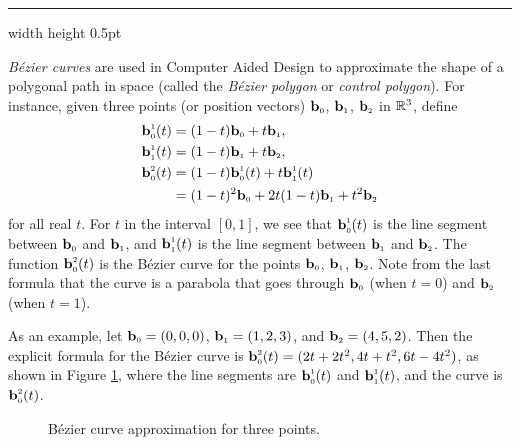 \smallskip
\hrule width \textwidth height 0.5pt
\begin{exmp}\label{exmp:bezier}
 \emph{B\'{e}zier curves} are used in Computer Aided Design to approximate the shape of a
 polygonal path in space (called the \emph{B\'{e}zier polygon} or \emph{control polygon}). For instance, given three
 points (or position vectors) $\textbf{b}_{\scriptscriptstyle 0}$, $\textbf{b}_{\scriptscriptstyle 1}$, $\textbf{b}_{\scriptscriptstyle 2}$ in $\mathbb{R}^{3}$,
 define
 \begin{align*}
  \textbf{b}_{\scriptscriptstyle 0}^{\scriptscriptstyle 1}(t) &= ( 1 - t )\textbf{b}_{\scriptscriptstyle 0} + t \textbf{b}_{\scriptscriptstyle 1},\\
  \textbf{b}_{\scriptscriptstyle 1}^{\scriptscriptstyle 1}(t) &= ( 1 - t )\textbf{b}_{\scriptscriptstyle 1} + t \textbf{b}_{\scriptscriptstyle 2},
  \\
  \textbf{b}_{\scriptscriptstyle 0}^{\scriptscriptstyle 2}(t) &=
  ( 1 - t )\textbf{b}_{\scriptscriptstyle 0}^{\scriptscriptstyle 1}(t) + t \textbf{b}_{\scriptscriptstyle 1}^{\scriptscriptstyle 1}(t)\\
  &= (1 - t)^2 \textbf{b}_{\scriptscriptstyle 0} + 2t(1 - t) \textbf{b}_{\scriptscriptstyle 1} + t^2 \textbf{b}_{\scriptscriptstyle 2}
 \end{align*}
 for all real $t$. For $t$ in the interval $[0,1]$, we see that $\textbf{b}_{\scriptscriptstyle 0}^{\scriptscriptstyle 1}(t)$ is the
 line segment between $\textbf{b}_{\scriptscriptstyle 0}$ and $\textbf{b}_{\scriptscriptstyle 1}$, and
 $\textbf{b}_{\scriptscriptstyle 1}^{\scriptscriptstyle 1}(t)$ is the line segment between $\textbf{b}_{\scriptscriptstyle 1}$ and
 $\textbf{b}_{\scriptscriptstyle 2}$. The function $\textbf{b}_{\scriptscriptstyle 0}^{\scriptscriptstyle 2}(t)$ is the
 B\'{e}zier curve for the points $\textbf{b}_{\scriptscriptstyle 0}$, $\textbf{b}_{\scriptscriptstyle 1}$, $\textbf{b}_{\scriptscriptstyle 2}$. Note from the
 last formula that the curve is a parabola that goes through $\textbf{b}_{\scriptscriptstyle 0}$ (when $t = 0$) and
 $\textbf{b}_{\scriptscriptstyle 2}$ (when $t = 1$).
 
 As an example, let $\textbf{b}_{\scriptscriptstyle 0} = (0,0,0)$, $\textbf{b}_{\scriptscriptstyle 1} = (1,2,3)$, and $\textbf{b}_{\scriptscriptstyle 2} =
 (4,5,2)$. Then the explicit formula for the B\'{e}zier curve is
 $\textbf{b}_{\scriptscriptstyle 0}^{\scriptscriptstyle 2}(t) = ( 2t + 2t^2, 4t + t^2, 6t - 4t^2 )$, as shown in Figure
 \ref{fig:bezier2}, where the line segments are $\textbf{b}_{\scriptscriptstyle 0}^{\scriptscriptstyle 1}(t)$ and
 $\textbf{b}_{\scriptscriptstyle 1}^{\scriptscriptstyle 1}(t)$, and the curve is
 $\textbf{b}_{\scriptscriptstyle 0}^{\scriptscriptstyle 2}(t)$.
 \begin{figure}[h]
  \begin{center}
   
  \end{center}
 \caption[]{\quad B\'{e}zier curve approximation for three points.}
 \label{fig:bezier2}
 \end{figure}


\end{exmp}
